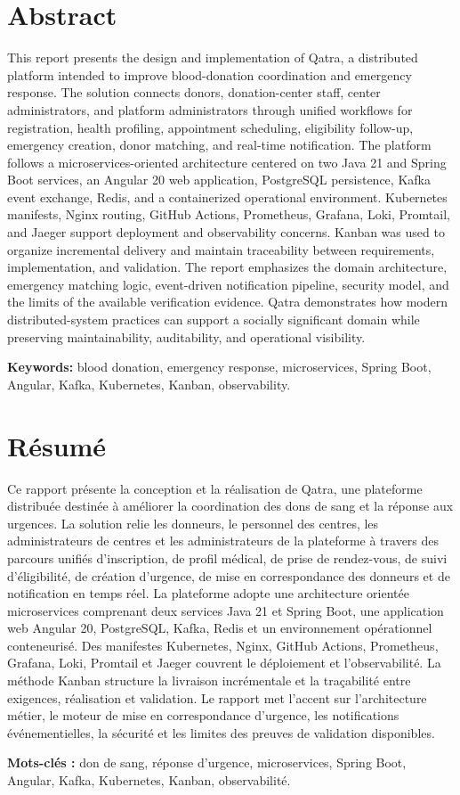 \chapter*{Abstract}

This report presents the design and implementation of Qatra, a distributed platform intended to improve blood-donation coordination and emergency response. The solution connects donors, donation-center staff, center administrators, and platform administrators through unified workflows for registration, health profiling, appointment scheduling, eligibility follow-up, emergency creation, donor matching, and real-time notification. The platform follows a microservices-oriented architecture centered on two Java 21 and Spring Boot services, an Angular 20 web application, PostgreSQL persistence, Kafka event exchange, Redis, and a containerized operational environment. Kubernetes manifests, Nginx routing, GitHub Actions, Prometheus, Grafana, Loki, Promtail, and Jaeger support deployment and observability concerns. Kanban was used to organize incremental delivery and maintain traceability between requirements, implementation, and validation. The report emphasizes the domain architecture, emergency matching logic, event-driven notification pipeline, security model, and the limits of the available verification evidence. Qatra demonstrates how modern distributed-system practices can support a socially significant domain while preserving maintainability, auditability, and operational visibility.

\textbf{Keywords:} blood donation, emergency response, microservices, Spring Boot, Angular, Kafka, Kubernetes, Kanban, observability.

\chapter*{Résumé}

Ce rapport présente la conception et la réalisation de Qatra, une plateforme distribuée destinée à améliorer la coordination des dons de sang et la réponse aux urgences. La solution relie les donneurs, le personnel des centres, les administrateurs de centres et les administrateurs de la plateforme à travers des parcours unifiés d'inscription, de profil médical, de prise de rendez-vous, de suivi d'éligibilité, de création d'urgence, de mise en correspondance des donneurs et de notification en temps réel. La plateforme adopte une architecture orientée microservices comprenant deux services Java 21 et Spring Boot, une application web Angular 20, PostgreSQL, Kafka, Redis et un environnement opérationnel conteneurisé. Des manifestes Kubernetes, Nginx, GitHub Actions, Prometheus, Grafana, Loki, Promtail et Jaeger couvrent le déploiement et l'observabilité. La méthode Kanban structure la livraison incrémentale et la traçabilité entre exigences, réalisation et validation. Le rapport met l'accent sur l'architecture métier, le moteur de mise en correspondance d'urgence, les notifications événementielles, la sécurité et les limites des preuves de validation disponibles.

\textbf{Mots-clés :} don de sang, réponse d'urgence, microservices, Spring Boot, Angular, Kafka, Kubernetes, Kanban, observabilité.

